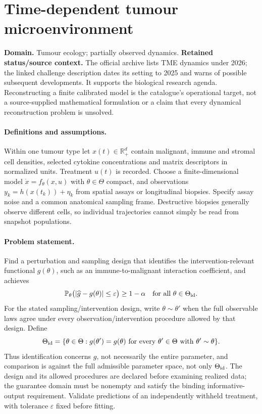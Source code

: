 \documentclass[11pt]{article}
\begin{document}
\section*{Time-dependent tumour microenvironment}
\label{prob:252}
\label{rank:107}
\par\smallskip

\noindent\textbf{Domain.} Tumour ecology; partially observed dynamics. \quad \textbf{Retained status/source context.} The official archive lists TME dynamics under 2026; the linked challenge description dates its setting to 2025 and warns of possible subsequent developments. It supports the biological research agenda. Reconstructing a finite calibrated model is the catalogue's operational target, not a source-supplied mathematical formulation or a claim that every dynamical reconstruction problem is unsolved.

\paragraph{Definitions and assumptions.} Within one tumour type let $x(t)\in\mathbb{R}_+^d$ contain malignant, immune and stromal cell densities, selected cytokine concentrations and matrix descriptors in normalized units. Treatment $u(t)$ is recorded. Choose a finite-dimensional model $\dot x=f_\theta(x,u)$ with $\theta\in\Theta$ compact, and observations $y_k=h(x(t_k))+\eta_k$ from spatial assays or longitudinal biopsies. Specify assay noise and a common anatomical sampling frame. Destructive biopsies generally observe different cells, so individual trajectories cannot simply be read from snapshot populations.

\paragraph{Problem statement.} Find a perturbation and sampling design that identifies the intervention-relevant functional $g(\theta)$, such as an immune-to-malignant interaction coefficient, and achieves
\[
\mathbb{P}_\theta\bigl(|\widehat g-g(\theta)|\leq\varepsilon\bigr)\geq1-\alpha
\quad\text{for all }\theta\in\Theta_{\rm id}.
\]
For the stated sampling/intervention design, write $\theta\sim\theta'$ when the full observable laws agree under every observation/intervention procedure allowed by that design. Define
\[
\Theta_{\rm id}=\{\theta\in\Theta: g(\theta')=g(\theta)\text{ for every }\theta'\in\Theta\text{ with }\theta'\sim\theta\}.
\]
Thus identification concerns $g$, not necessarily the entire parameter, and comparison is against the full admissible parameter space, not only $\Theta_{\rm id}$. The design and its allowed procedures are declared before examining realized data; the guarantee domain must be nonempty and satisfy the binding informative-output requirement. Validate predictions of an independently withheld treatment, with tolerance $\varepsilon$ fixed before fitting.
\end{document}
